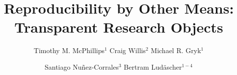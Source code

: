 \documentclass[sigconf,screen,nonacm]{acmart}
\begin{document}
\title[Reproducibility by Other Means]{Reproducibility by Other Means: Transparent Research Objects}

\author{Timothy M. McPhillips$^1$ \qquad Craig Willis$^2$ \qquad Michael
  R. Gryk$^1$}

\author{ Santiago Nu\~{n}ez-Corrales$^3$ \qquad Bertram
  Lud\"ascher$^{1{-}4}$}

 



\maketitle
















%
%


\end{document}
